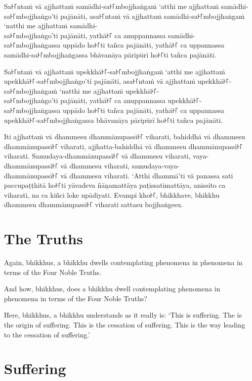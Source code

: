 Sa꜔꜒ntaṁ vā ajjhattaṁ samādhi-sa꜔꜒mbojjhaṅgaṁ ‘atthi me ajjhattaṁ samādhi-sa꜔꜒mbojjhaṅgo’ti pajānāti,
asa꜔꜒ntaṁ vā ajjhattaṁ samādhi-sa꜔꜒mbojjhaṅgaṁ ‘natthi me ajjhattaṁ samādhi-\\ sa꜔꜒mbojjhaṅgo’ti pajānāti,
yathā꜔꜒ ca anuppannassa samādhi-\\ sa꜔꜒mbojjhaṅgassa uppādo ho꜔꜒ti tañca pajānāti,
yathā꜔꜒ ca uppannassa samādhi-sa꜔꜒mbojjhaṅgassa bhāvanāya pāripūrī ho꜔꜒ti tañca pajānāti.

Sa꜔꜒ntaṁ vā ajjhattaṁ upekkhā꜔꜒-sa꜔꜒mbojjhaṅgaṁ ‘atthi me ajjhattaṁ upekkhā꜔꜒-sa꜔꜒mbojjhaṅgo’ti pajānāti,
asa꜔꜒ntaṁ vā ajjhattaṁ upekkhā꜔꜒-sa꜔꜒mbojjhaṅgaṁ ‘natthi me ajjhattaṁ upekkhā꜔꜒-\\ sa꜔꜒mbojjhaṅgo’ti pajānāti,
yathā꜔꜒ ca anuppannassa upekkhā꜔꜒-\\ sa꜔꜒mbojjhaṅgassa uppādo ho꜔꜒ti tañca pajānāti,
yathā꜔꜒ ca uppannassa upekkhā꜔꜒-sa꜔꜒mbojjhaṅgassa bhāvanāya pāripūrī ho꜔꜒ti tañca pajānāti.

Iti ajjhattaṁ vā dhammesu dhammānupassī꜔꜒ viharati,
bahiddhā vā dhammesu dhammānupassī꜔꜒ viharati,
ajjhatta-bahiddhā vā dhammesu dhammānupassī꜔꜒ viharati.
Samudaya-dhammānupassī꜔꜒ vā dhammesu viharati,
vaya-dhammānupassī꜔꜒ vā dhammesu viharati,
samudaya-vaya-\\ dhammānupassī꜔꜒ vā dhammesu viharati.
‘Atthi dhammā’ti vā panassa sati paccupaṭṭhitā ho꜔꜒ti
yāvadeva ñāṇamattāya paṭissatimattāya, anissito ca viharati,
na ca kiñci loke upādiyati. Evampi kho꜔꜒, bhikkhave, bhikkhu
dhammesu dhammānupassī꜔꜒ viharati sattasu bojjhaṅgesu.

\enlargethispage{\baselineskip}


\englishPage
\section*{The Truths}%

Again, bhikkhus, a bhikkhu dwells contemplating phenomena in phenomena in terms
of the Four Noble Truths.

And how, bhikkhus, does a bhikkhu dwell contemplating phenomena in phenomena in
terms of the Four Noble Truths?

Here, bhikkhus, a bhikkhu understands as it really is: `This is suffering. The
is the origin of suffering. This is the cessation of suffering. This is the way
leading to the cessation of suffering.'

\section{Suffering}

